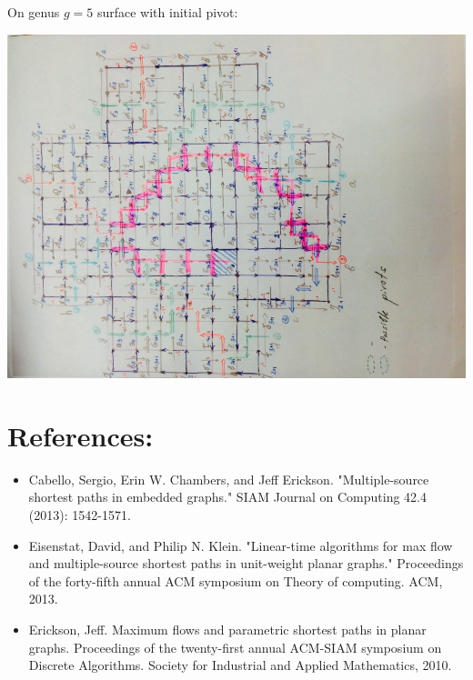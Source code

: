 \documentclass{article}
\begin{document}
\newpage
On genus $g = 5$ surface with initial pivot:
\begin{center}
\includegraphics[angle = -90, scale = 0.7]{genus4_after5Pivots.jpg}
\end{center}




\newpage
\section{References:}
\begin{itemize}
\item Cabello, Sergio, Erin W. Chambers, and Jeff Erickson. "Multiple-source 
  shortest paths in embedded graphs." SIAM Journal on Computing 42.4 (2013): 1542-1571.
\item Eisenstat, David, and Philip N. Klein. "Linear-time algorithms for max 
  flow and multiple-source shortest paths in unit-weight planar graphs." 
  Proceedings of the forty-fifth annual ACM symposium on Theory of computing. ACM, 2013.
\item Erickson, Jeff. Maximum flows and parametric shortest paths in planar graphs.
  Proceedings of the twenty-first annual ACM-SIAM symposium on Discrete Algorithms. 
  Society for Industrial and Applied Mathematics, 2010.
\end{itemize}
\end{document}
